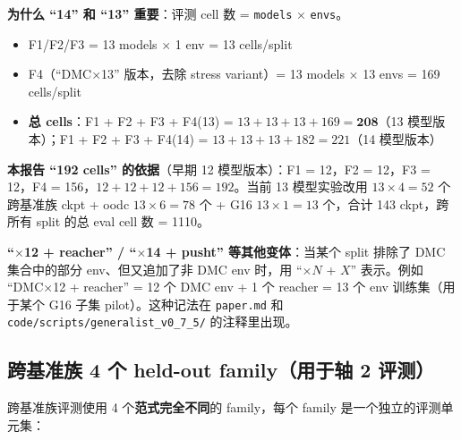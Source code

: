 \documentclass[11pt,a4paper]{article}
\begin{document}
\textbf{为什么 ``14'' 和 ``13'' 重要}：评测 cell 数 = \texttt{models} $\times$ \texttt{envs}。
\begin{itemize}[leftmargin=2em]
\item F1/F2/F3 = 13 models $\times$ 1 env = 13 cells/split
\item F4（``DMC$\times$13'' 版本，去除 stress variant）= 13 models $\times$ 13 envs = 169 cells/split
\item \textbf{总 cells}：F1 + F2 + F3 + F4(13) = $13 + 13 + 13 + 169 = \mathbf{208}$（13 模型版本）；F1 + F2 + F3 + F4(14) = $13 + 13 + 13 + 182 = 221$（14 模型版本）
\end{itemize}

\textbf{本报告 ``192 cells'' 的依据}（早期 12 模型版本）：F1 = 12，F2 = 12，F3 = 12，F4 = 156，$12 + 12 + 12 + 156 = 192$。当前 13 模型实验改用 $13 \times 4 = 52$ 个跨基准族 ckpt + oodc $13 \times 6 = 78$ 个 + G16 $13 \times 1 = 13$ 个，合计 143 ckpt，跨所有 split 的总 eval cell 数 = 1110。

\textbf{``$\times$12 + reacher'' / ``$\times$14 + pusht'' 等其他变体}：当某个 split 排除了 DMC 集合中的部分 env、但又追加了非 DMC env 时，用 ``$\times N$ + $X$'' 表示。例如 ``DMC$\times$12 + reacher'' = 12 个 DMC env + 1 个 reacher = 13 个 env 训练集（用于某个 G16 子集 pilot）。这种记法在 \texttt{paper.md} 和 \texttt{code/scripts/generalist\_v0\_7\_5/} 的注释里出现。

\subsection{跨基准族 4 个 held-out family（用于轴 2 评测）}

跨基准族评测使用 4 个\textbf{范式完全不同}的 family，每个 family 是一个独立的评测单元集：
\end{document}
